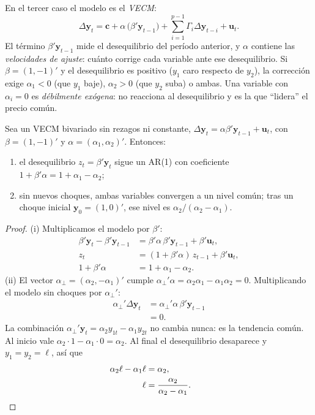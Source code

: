 En el tercer caso el modelo es el \emph{VECM}:
\[
  \Delta\mathbf y_t=\mathbf c+\alpha\,\bigl(\beta'\mathbf y_{t-1}\bigr)+\sum_{i=1}^{p-1}\Gamma_i\Delta\mathbf y_{t-i}+\mathbf u_t .
\]
El término $\beta'\mathbf y_{t-1}$ mide el desequilibrio del período anterior, y $\alpha$ contiene las
\emph{velocidades de ajuste}: cuánto corrige cada variable ante ese desequilibrio. Si $\beta=(1,-1)'$ y el
desequilibrio es positivo ($y_1$ caro respecto de $y_2$), la corrección exige $\alpha_1<0$ (que $y_1$ baje),
$\alpha_2>0$ (que $y_2$ suba) o ambas. Una variable con $\alpha_i=0$ es \emph{débilmente exógena}: no reacciona al
desequilibrio y es la que ``lidera'' el precio común.

\begin{proposicion}\label{prop:ajustevecm}
Sea un VECM bivariado sin rezagos ni constante,
$\Delta\mathbf y_t=\alpha\beta'\mathbf y_{t-1}+\mathbf u_t$, con $\beta=(1,-1)'$ y $\alpha=(\alpha_1,\alpha_2)'$.
Entonces:
\begin{enumerate}[label=(\roman*)]
  \item el desequilibrio $z_t=\beta'\mathbf y_t$ sigue un AR(1) con coeficiente $1+\beta'\alpha=1+\alpha_1-\alpha_2$;
  \item sin nuevos choques, ambas variables convergen a un nivel común; tras un choque inicial
        $\mathbf y_0=(1,0)'$, ese nivel es $\alpha_2/(\alpha_2-\alpha_1)$.
\end{enumerate}
\end{proposicion}

\begin{proof}
(i) Multiplicamos el modelo por $\beta'$:
\begin{align*}
  \beta'\mathbf y_t-\beta'\mathbf y_{t-1} &= \beta'\alpha\,\beta'\mathbf y_{t-1}+\beta'\mathbf u_t,\\
  z_t &= (1+\beta'\alpha)\,z_{t-1}+\beta'\mathbf u_t,\\
  1+\beta'\alpha &= 1+\alpha_1-\alpha_2 .
\end{align*}
(ii) El vector $\alpha_\perp=(\alpha_2,-\alpha_1)'$ cumple $\alpha_\perp'\alpha=\alpha_2\alpha_1-\alpha_1\alpha_2=0$.
Multiplicando el modelo sin choques por $\alpha_\perp'$:
\begin{align*}
  \alpha_\perp'\Delta\mathbf y_t &= \alpha_\perp'\alpha\,\beta'\mathbf y_{t-1}\\
                                 &= 0 .
\end{align*}
La combinación $\alpha_\perp'\mathbf y_t=\alpha_2y_{1t}-\alpha_1y_{2t}$ no cambia nunca: es la tendencia común.
Al inicio vale $\alpha_2\cdot1-\alpha_1\cdot0=\alpha_2$. Al final el desequilibrio desaparece y
$y_1=y_2=\ell$, así que
\begin{align*}
  \alpha_2\ell-\alpha_1\ell &= \alpha_2,\\
  \ell &= \frac{\alpha_2}{\alpha_2-\alpha_1}. && \qedhere
\end{align*}
\end{proof}

